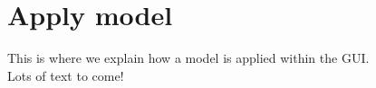 
\chapter{Apply model}
\minitoc

This is where we explain how a model is applied within the GUI. \\
Lots of text to come!